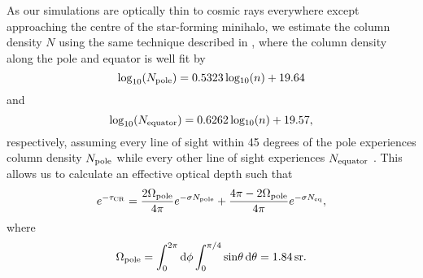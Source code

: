 As our simulations are optically thin to cosmic rays everywhere except approaching the centre of the star-forming minihalo, we estimate the column density $N$ using the same technique described in \citep{Hummeletal2015}, where the column density along the pole and equator is well fit by 
\begin{equation}
{\rm log}_{10}(N_{\rm \small pole}) = 0.5323\, {\rm log_{10}}(n) + 19.64
\end{equation}
and
\begin{equation}
{\rm log}_{10}(N_{\rm \small equator}) = 0.6262\, {\rm log_{10}}(n) + 19.57, 
\end{equation}
respectively, assuming every line of sight within 45 degrees of the pole experiences column density $N_{\rm \small pole}$ while every other line of sight experiences $N_{\rm \small equator}$ \citep{Hosokawaetal2011}. This allows us to calculate an effective optical depth such that
\begin{equation}
e^{-\tau_{\rm \small CR}} = \frac{2 \Omega_{\rm \small pole}}{4\pi} e^{-\sigma N_{\rm \small pole}} + \frac{4\pi - 2 \Omega_{\rm \small pole}}{4\pi} e^{-\sigma N_{\rm \small eq}},
\end{equation}
where
\begin{equation}
\Omega_{\rm \small pole} = \int_0^{2\pi}{\rm d}\phi \int_0^{\pi/4}{\rm sin}\theta \,{\rm d}\theta = 1.84\,{\rm sr}.
\end{equation}
  
  
  
  
  
  
  
  
  
  
  
  
  
  